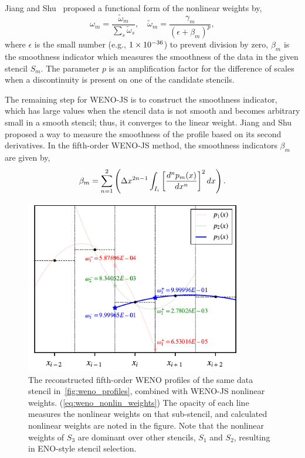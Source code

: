 Jiang and Shu~\cite{jiang1996efficient} proposed a functional form of
the nonlinear weights by,
\begin{equation}\label{eq:weno_nonlin_weights}
    \omega_{m} = \frac{\widetilde{\omega}_{m}}{\sum_{s} \widetilde{\omega}_{s}}, \quad
        \widetilde{\omega}_{m} = \frac{\gamma_{m}}{{\left( \epsilon + \beta_{m} \right)}^{p}},
\end{equation}
where \( \epsilon \) is the small number (e.g., \( \num{1.E-36} \)) to prevent division by zero,
\( \beta_{m} \) is the smoothness indicator which measures the smoothness of the data
in the given stencil \( S_{m} \).
The parameter \( p \) is an amplification factor for the difference of scales
when a discontinuity is present on one of the candidate stencils.

The remaining step for WENO-JS is to construct the smoothness indicator,
which has large values when the stencil data is not smooth and becomes arbitrary small in a smooth stencil;
thus, it converges to the linear weight.
Jiang and Shu proposed a way to measure the smoothness of the profile based on its second derivatives.
In the fifth-order WENO-JS method, the smoothness indicators \( \beta_{m} \) are given by,
\begin{equation}\label{eq:weno_smoothness_ind}
    \beta_{m} = \sum_{n = 1}^{2} \left( \Delta x^{2n-1} \int_{I_{i}} {\left[ \frac{d^{n} p_{m} (x)}{dx^{n}} \right]}^{2} \mathop{dx} \right).
\end{equation}

\begin{figure}
    \centering
    \includegraphics[width=0.85\textwidth]{fig/weno_p1p2p3_nonlinW}
    \caption{The reconstructed fifth-order WENO profiles of the same data stencil in~\cref{fig:weno_profiles},
        combined with WENO-JS nonlinear weights. (\cref{eq:weno_nonlin_weights})
        The opacity of each line measures the nonlinear weights on that sub-stencil,
        and calculated nonlinear weights are noted in the figure.
        Note that the nonlinear weights of \( S_{3} \) are dominant over other stencils, \( S_{1} \) and \( S_{2} \),
        resulting in ENO-style stencil selection.
    }\label{fig:weno_profiles_nonlinW}
\end{figure}

